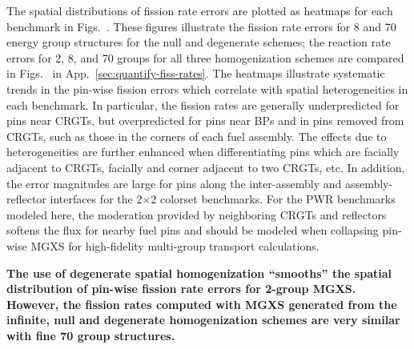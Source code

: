 The spatial distributions of fission rate errors are plotted as heatmaps for each benchmark in Figs.~. These figures illustrate the fission rate errors for 8 and 70 energy group structures for the null and degenerate schemes; the reaction rate errors for 2, 8, and 70 groups for all three homogenization schemes are compared in Figs.~ in App.~\ref{sec:quantify-fiss-rates}. The heatmaps illustrate systematic trends in the pin-wise fission errors which correlate with spatial heterogeneities in each benchmark. In particular, the fission rates are generally underpredicted for pins near \acp{CRGT}, but overpredicted for pins near \acp{BP} and in pins removed from \acp{CRGT}, such as those in the corners of each fuel assembly. The effects due to heterogeneities are further enhanced when differentiating pins which are facially adjacent to \acp{CRGT}, facially and corner adjacent to two \acp{CRGT}, etc. In addition, the error magnitudes are large for pins along the inter-assembly and assembly-reflector interfaces for the 2$\times$2 colorset benchmarks. For the \ac{PWR} benchmarks modeled here, the moderation provided by neighboring \acp{CRGT} and reflectors softens the flux for nearby fuel pins and should be modeled when collapsing pin-wise \ac{MGXS} for high-fidelity multi-group transport calculations.


\begin{emphbox}
\textbf{The use of degenerate spatial homogenization ``smooths'' the spatial distribution of pin-wise fission rate errors for 2-group \ac{MGXS}. However, the fission rates computed with \ac{MGXS} generated from the infinite, null and degenerate homogenization schemes are very similar with fine 70 group structures.}
\end{emphbox}

